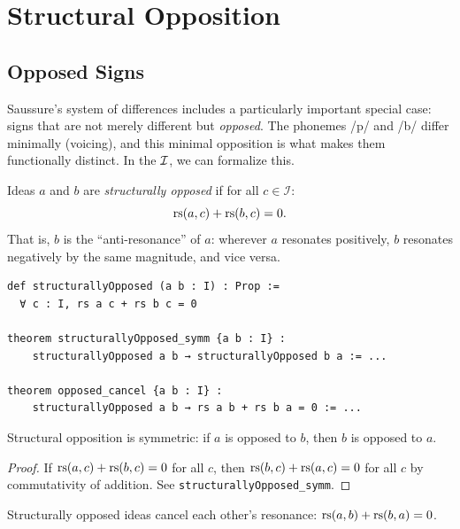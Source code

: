 \section{Structural Opposition}

\subsection{Opposed Signs}

Saussure's system of differences includes a particularly important
special case: signs that are not merely different but \emph{opposed}.
The phonemes /p/ and /b/ differ minimally (voicing), and this minimal
opposition is what makes them functionally distinct. In the $\mathcal{I}$,
we can formalize this.

\begin{definition}
\label{def:structural-opposition}
Ideas $a$ and $b$ are \emph{structurally opposed} if for all
$c \in \mathcal{I}$:
\[
  \mathrm{rs}(a, c) + \mathrm{rs}(b, c) = 0.
\]
That is, $b$ is the ``anti-resonance'' of $a$: wherever $a$ resonates
positively, $b$ resonates negatively by the same magnitude, and vice
versa.
\end{definition}

\begin{lstlisting}[caption={Structural opposition and its properties}]
def structurallyOpposed (a b : I) : Prop :=
  ∀ c : I, rs a c + rs b c = 0

theorem structurallyOpposed_symm {a b : I} :
    structurallyOpposed a b → structurallyOpposed b a := ...

theorem opposed_cancel {a b : I} :
    structurallyOpposed a b → rs a b + rs b a = 0 := ...
\end{lstlisting}

\begin{theorem}
\label{thm:opposed-symm}
Structural opposition is symmetric: if $a$ is opposed to $b$, then
$b$ is opposed to $a$.
\end{theorem}

\begin{proof}
If $\mathrm{rs}(a, c) + \mathrm{rs}(b, c) = 0$ for all $c$, then
$\mathrm{rs}(b, c) + \mathrm{rs}(a, c) = 0$ for all $c$ by commutativity of
addition. See \texttt{structurallyOpposed\_symm}.
\end{proof}

\begin{theorem}
\label{thm:opposed-cancel}
Structurally opposed ideas cancel each other's resonance:
$\mathrm{rs}(a, b) + \mathrm{rs}(b, a) = 0$.
\end{theorem}

